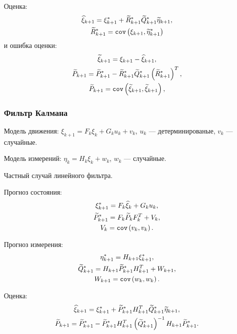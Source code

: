 Оценка:
\begin{gather*}
    \widehat{\xi}_{k+1} = \xi_{k+1}^* + \widetilde{R}_{k+1}^* \widetilde{Q}_{k+1}^* \widetilde{\eta}_{k+1} , \\
    \widetilde{R}_{k+1}^* = \mathtt{cov} \left( \xi_{k+1}, \widetilde{\eta}_{k+1}^* \right)
\end{gather*}
и ошибка оценки:
\begin{gather*}
    \widetilde{\xi}_{k+1} = \xi_{k+1} - \widehat{\xi}_{k+1} , \\
    \widetilde{P}_{k+1} = \widetilde{P}_{k+1}^* - \widetilde{R}_{k+1}^* \widetilde{Q}_{k+1}^* \left( \widetilde{R}_{k+1}^* \right)^T, \\
    \widetilde{P}_{k+1} = \mathtt{cov} \left( \widetilde{\xi}_{k+1}, \widetilde{\xi}_{k+1} \right) , \\
\end{gather*}

\subsubsection{Фильтр Калмана}

Модель движения: $\xi_{k+1} = F_k \xi_k + G_k u_k + v_k$, $u_k$ --- детерминированые, $v_k$ --- случайные.

Модель измерений: $\eta_{k} = H_k \xi_k + w_k$, $w_k$ --- случайные.

Частный случай линейного фильтра.

Прогноз состояния:
\begin{gather*}
    \xi_{k+1}^* = F_k \widehat{\xi}_k + G_k u_k , \\
    \widetilde{P}_{k+1}^* = F_k \widetilde{P}_k F_k^T + V_k , \\
    V_k = \mathtt{cov} \left( v_k, v_k \right) .
\end{gather*}

Прогноз измерения:
\begin{gather*}
    \eta_{k+1}^* = H_{k+1} \xi_{k+1}^* , \\
    \widetilde{Q}_{k+1}^* = H_{k+1} \widetilde{P}_{k+1}^* H_{k+1}^T + W_{k+1} , \\
    W_{k+1} = \mathtt{cov} \left( w_k, w_k \right) .
\end{gather*}

Оценка:
\begin{gather*}
    \widehat{\xi}_{k+1} = \xi_{k+1}^* + \widetilde{P}_{k+1}^* H_{k+1}^T \widetilde{Q}_{k+1}^* \widetilde{\eta}_{k+1}, \\
    \widetilde{P}_{k+1} = \widetilde{P}_{k+1}^* - \widetilde{P}_{k+1}^* H_{k+1}^T \left( \widetilde{Q}_{k+1}^* \right)^{-1} H_{k+1} \widetilde{P}_{k+1}^* .
\end{gather*}
